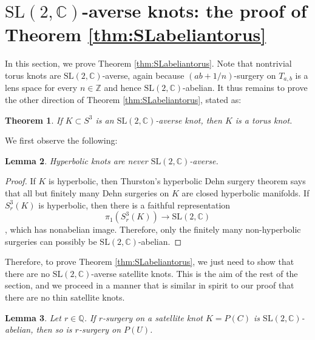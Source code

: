 \documentclass[11pt]{amsart}
\newtheorem {theorem}{Theorem}
\newtheorem {lemma}[theorem]{Lemma}
\numberwithin{equation}{section}
\numberwithin{theorem}{section}
\theoremstyle{definition}
\newcommand{\Z}{\mathbb{Z}}
\newcommand{\C}{\mathbb{C}}
\newcommand{\Q}{\mathbb{Q}}
\newcommand\SL{\mathrm{SL}}
\begin{document}
%
%
%
%
%

\section{$\SL(2,\C)$-averse knots: the proof of Theorem \ref{thm:SLabeliantorus}}
\label{sec:SL}

In this section, we prove Theorem \ref{thm:SLabeliantorus}. Note that nontrivial torus knots are $\SL(2,\C)$-averse, again because  $(ab+1/n)$-surgery on $T_{a,b}$ is a lens space for every $n\in \Z$ and hence $\SL(2,\C)$-abelian.  It thus  remains to prove the other direction of  Theorem \ref{thm:SLabeliantorus}, stated as:

\begin{theorem} \label{thm:SLabeliantorus-proof}
If $K \subset S^3$ is an $\SL(2,\C)$-averse knot, then $K$ is a torus knot.
\end{theorem}

We first observe the following:

\begin{lemma} \label{lem:sl2-averse-hyperbolic}
Hyperbolic knots are never $\SL(2,\C)$-averse.
\end{lemma}

\begin{proof}
If $K$ is hyperbolic, then Thurston's hyperbolic Dehn surgery theorem \cite[Theorem~5.8.2]{thurston-notes} says that all but finitely many Dehn surgeries on $K$ are closed hyperbolic manifolds.  If $S^3_r(K)$ is hyperbolic, then there is a faithful representation \[\pi_1(S^3_r(K)) \to \SL(2,\C)\] \cite[Proposition~3.1.1]{cs-splittings}, which has nonabelian image.  Therefore, only the finitely many non-hyperbolic surgeries can possibly be $\SL(2,\C)$-abelian.
\end{proof}

Therefore, to prove Theorem \ref{thm:SLabeliantorus}, we just need to show that there are no $\SL(2,\C)$-averse satellite knots. This is the aim of the rest of the section, and we proceed in a manner that is similar in spirit to our proof that there are no thin satellite knots. 

\begin{lemma} \label{lem:sl2-abelian-pinch}
Let $r\in\Q$.  If $r$-surgery on a satellite knot $K = P(C)$ is $\SL(2,\C)$-abelian, then so is $r$-surgery on $P(U)$.
\end{lemma}
\end{document}

